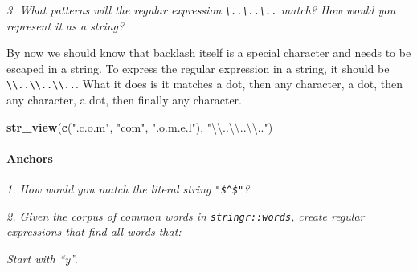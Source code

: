 \documentclass[]{article}
\newenvironment{Shaded}{\begin{snugshade}}{\end{snugshade}}
\newcommand{\KeywordTok}[1]{\textcolor[rgb]{0.13,0.29,0.53}{\textbf{#1}}}
\newcommand{\CharTok}[1]{\textcolor[rgb]{0.31,0.60,0.02}{#1}}
\newcommand{\StringTok}[1]{\textcolor[rgb]{0.31,0.60,0.02}{#1}}
\newcommand{\NormalTok}[1]{#1}
\let\oldparagraph\paragraph
\renewcommand{\paragraph}[1]{\oldparagraph{#1}\mbox{}}
\theoremstyle{definition}
\theoremstyle{definition}
\theoremstyle{definition}
\theoremstyle{remark}
\begin{document}
\hypertarget{htmlwidget-b4d48ad9cb62e74eac96}{}

\emph{3. What patterns will the regular expression
\texttt{\textbackslash{}..\textbackslash{}..\textbackslash{}..} match?
How would you represent it as a string?}

By now we should know that backlash itself is a special character and
needs to be escaped in a string. To express the regular expression in a
string, it should be
\texttt{\textbackslash{}\textbackslash{}..\textbackslash{}\textbackslash{}..\textbackslash{}\textbackslash{}..}.
What it does is it matches a dot, then any character, a dot, then any
character, a dot, then finally any character.

\begin{Shaded}
\begin{Highlighting}[]
\KeywordTok{str_view}\NormalTok{(}\KeywordTok{c}\NormalTok{(}\StringTok{".c.o.m"}\NormalTok{, }\StringTok{"com"}\NormalTok{, }\StringTok{".o.m.e.l"}\NormalTok{), }\StringTok{"}\CharTok{\textbackslash{}\textbackslash{}}\StringTok{..}\CharTok{\textbackslash{}\textbackslash{}}\StringTok{..}\CharTok{\textbackslash{}\textbackslash{}}\StringTok{.."}\NormalTok{)}
\end{Highlighting}
\end{Shaded}

\hypertarget{htmlwidget-647b1ffa538b4192511b}{}

\paragraph{Anchors}\label{anchors}

\emph{1. How would you match the literal string \texttt{"\$\^{}\$"}?}

\begin{Shaded}
\end{Shaded}

\hypertarget{htmlwidget-785e1020de73034845ad}{}

\emph{2. Given the corpus of common words in \texttt{stringr::words},
create regular expressions that find all words that:}

\emph{Start with ``y''.}
\end{document}
